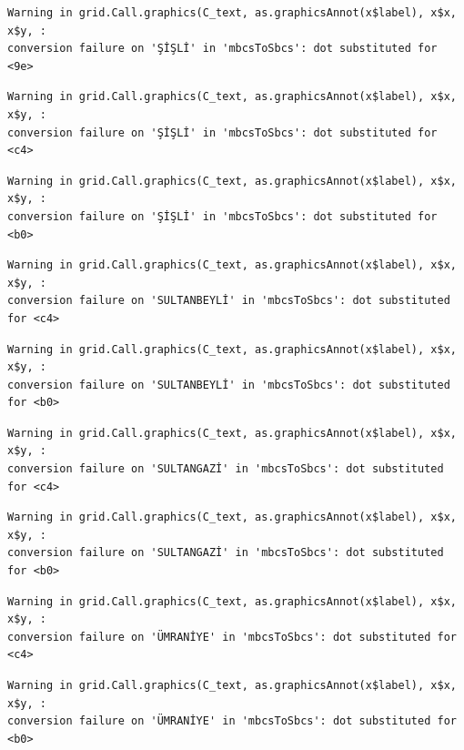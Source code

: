 \documentclass[
  11pt,
  a4paper,
  DIV=11,
  numbers=noendperiod]{scrartcl}
\begin{document}
\begin{verbatim}
Warning in grid.Call.graphics(C_text, as.graphicsAnnot(x$label), x$x, x$y, :
conversion failure on 'ŞİŞLİ' in 'mbcsToSbcs': dot substituted for <9e>
\end{verbatim}

\begin{verbatim}
Warning in grid.Call.graphics(C_text, as.graphicsAnnot(x$label), x$x, x$y, :
conversion failure on 'ŞİŞLİ' in 'mbcsToSbcs': dot substituted for <c4>
\end{verbatim}

\begin{verbatim}
Warning in grid.Call.graphics(C_text, as.graphicsAnnot(x$label), x$x, x$y, :
conversion failure on 'ŞİŞLİ' in 'mbcsToSbcs': dot substituted for <b0>
\end{verbatim}

\begin{verbatim}
Warning in grid.Call.graphics(C_text, as.graphicsAnnot(x$label), x$x, x$y, :
conversion failure on 'SULTANBEYLİ' in 'mbcsToSbcs': dot substituted for <c4>
\end{verbatim}

\begin{verbatim}
Warning in grid.Call.graphics(C_text, as.graphicsAnnot(x$label), x$x, x$y, :
conversion failure on 'SULTANBEYLİ' in 'mbcsToSbcs': dot substituted for <b0>
\end{verbatim}

\begin{verbatim}
Warning in grid.Call.graphics(C_text, as.graphicsAnnot(x$label), x$x, x$y, :
conversion failure on 'SULTANGAZİ' in 'mbcsToSbcs': dot substituted for <c4>
\end{verbatim}

\begin{verbatim}
Warning in grid.Call.graphics(C_text, as.graphicsAnnot(x$label), x$x, x$y, :
conversion failure on 'SULTANGAZİ' in 'mbcsToSbcs': dot substituted for <b0>
\end{verbatim}

\begin{verbatim}
Warning in grid.Call.graphics(C_text, as.graphicsAnnot(x$label), x$x, x$y, :
conversion failure on 'ÜMRANİYE' in 'mbcsToSbcs': dot substituted for <c4>
\end{verbatim}

\begin{verbatim}
Warning in grid.Call.graphics(C_text, as.graphicsAnnot(x$label), x$x, x$y, :
conversion failure on 'ÜMRANİYE' in 'mbcsToSbcs': dot substituted for <b0>
\end{verbatim}
\end{document}
